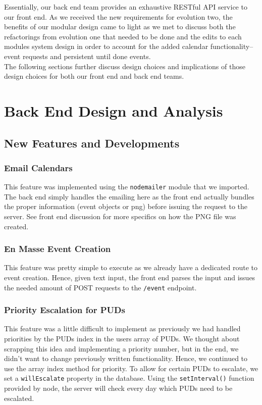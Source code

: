 \documentclass[11pt]{article}   %
\begin{document}
\noindent Essentially, our back end team provides an exhaustive RESTful API service to our front end. As we received the new requirements for evolution two, the benefits of our modular design came to light as we met to discuss both the refactorings from evolution one that needed to be done and the edits to each modules system design in order to account for the added calendar functionality--event requests and persistent until done events.\\

\noindent The following sections further discuss design choices and implications of those design choices for both our front end and back end teams. \\

\section{Back End Design and Analysis}
\subsection{New Features and Developments}
\subsubsection*{Email Calendars}
This feature was implemented using the \texttt{nodemailer} module that we imported. The back end simply handles the emailing here as the front end actually bundles the proper information (event objects or png) before issuing the request to the server. See front end discussion for more specifics on how the PNG file was created. 
\subsubsection*{En Masse Event Creation}
This feature was pretty simple to execute as we already have a dedicated route to event creation. Hence, given text input, the front end parses the input and issues the needed amount of POST requests to the \texttt{/event} endpoint.
\subsubsection*{Priority Escalation for PUDs}
This feature was a little difficult to implement as previously we had handled priorities by the PUDs index in the users array of PUDs. We thought about scrapping this idea and implementing a priority number, but in the end, we didn't want to change previously written functionality. Hence, we continued to use the array index method for priority. To allow for certain PUDs to escalate, we set a \texttt{willEscalate} property in the database. Using the \texttt{setInterval()} function provided by node, the server will check every day which PUDs need to be escalated.
\end{document}
